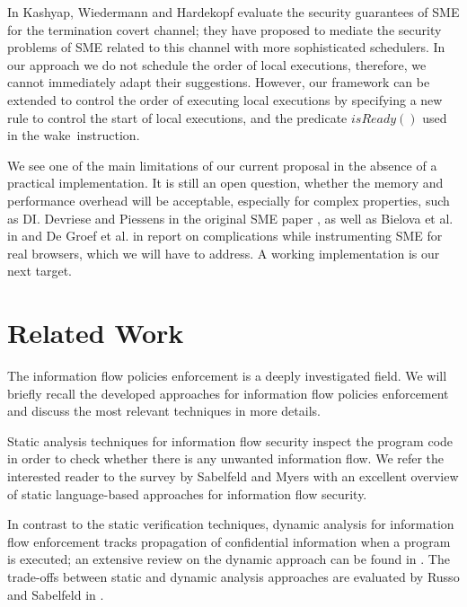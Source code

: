 \documentclass[10pt,a4paper,oneside]{article}
\def\NWAKE{wake}
\def\NISREADY{\ensuremath{isReady}}
\def\isReady#1{\ensuremath{\NISREADY(#1)}}
\begin{document}
In \cite{Kash-Wied-Hard-11-SSP} Kashyap, Wiedermann and Hardekopf evaluate the security guarantees of SME for the termination covert channel; they have proposed to mediate the security problems of SME related to this channel with more sophisticated schedulers. In our approach we do not schedule the order of local executions, therefore, we cannot immediately adapt their suggestions. However, our framework can be extended to control the order of executing local executions by specifying a new rule to control the start of local executions, and the predicate \isReady{} used in the \NWAKE\ instruction.





 We see one of the main limitations of our current proposal in the absence of a practical implementation. It is still an open question, whether the memory and performance overhead will be acceptable, especially for complex properties, such as DI. Devriese and Piessens in the original SME paper \cite{Devr-Pies-10-IEEESP}, as well as Bielova et al. in \cite{Biel-etal-11-NSS} and De Groef et al. in \cite{DeGroef-etal-12-CCS} report on complications while instrumenting SME for real browsers, which we will have to address. A working implementation is our next target.


\section{Related Work}\label{sec:relwork}
The information flow policies enforcement is a deeply investigated field. We will briefly recall the developed approaches for information flow policies enforcement and discuss the most relevant techniques in more details.

Static analysis techniques for information flow security inspect the program code in order to check whether there is any unwanted information flow. We refer the interested reader to the survey by Sabelfeld and Myers \cite{Sabe-Myer-2003} with an excellent overview of static language-based approaches for information flow security.








In contrast to the static verification techniques, dynamic analysis for information flow enforcement tracks propagation of confidential information when a program is executed;  an extensive review on the dynamic approach can be found in \cite{LeGu-07}. The trade-offs between static and dynamic analysis approaches are evaluated by Russo and Sabelfeld in \cite{Russ-Sabe-10-CSF}. 
\end{document}
